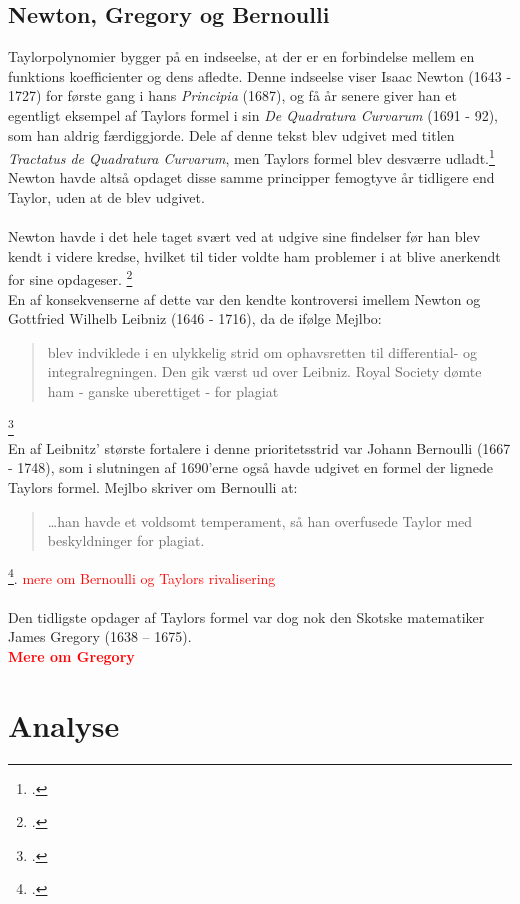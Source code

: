 \documentclass[12pt, a4paper]{article}
\begin{document}
\begin{refsection}
\subsection{Newton, Gregory og Bernoulli}

Taylorpolynomier bygger på en indseelse, at der er en forbindelse mellem en funktions koefficienter og dens afledte. Denne indseelse viser Isaac Newton (1643 - 1727) for første gang i hans \textit{Principia} (1687), og få år senere giver han et egentligt eksempel af Taylors formel i sin \textit{De Quadratura Curvarum} (1691 - 92), som han aldrig færdiggjorde. Dele af denne tekst blev udgivet med titlen \textit{Tractatus de Quadratura Curvarum}, men Taylors formel blev desværre udladt.\footcite[s. 248]{roy_2021} Newton havde altså opdaget disse samme principper femogtyve år tidligere end Taylor, uden at de blev udgivet.\\
\\
Newton havde i det hele taget svært ved at udgive sine findelser før han blev kendt i videre kredse, hvilket til tider voldte ham problemer i at blive anerkendt for sine opdageser. \footcite[s. 116]{uendeligerækker}\\
En af konsekvenserne af dette var den kendte kontroversi imellem Newton og Gottfried Wilhelb Leibniz (1646 - 1716), da de ifølge Mejlbo:
\blockquote{blev indviklede i en ulykkelig strid om ophavsretten til differential- og integralregningen. Den gik værst  ud over Leibniz. Royal Society dømte ham - ganske uberettiget - for plagiat}.\footcite[s. 103]{uendeligerækker}\\
En af Leibnitz' største fortalere i denne prioritetsstrid var Johann Bernoulli (1667 - 1748), som i slutningen af 1690'erne også havde udgivet en formel der lignede Taylors formel. Mejlbo skriver om Bernoulli at: \blockquote{\dots han havde et voldsomt temperament, så han overfusede Taylor med beskyldninger for plagiat.}\footcite[s. 111]{uendeligerækker}. \textcolor{red}{mere om Bernoulli og Taylors rivalisering}\\
\\
Den tidligste opdager af Taylors formel var dog nok den Skotske matematiker James Gregory (1638 – 1675).\\
\textcolor{red}{\textbf{Mere om Gregory}} 
\newpage
\section{Analyse} %

\end{refsection}
\end{document}
